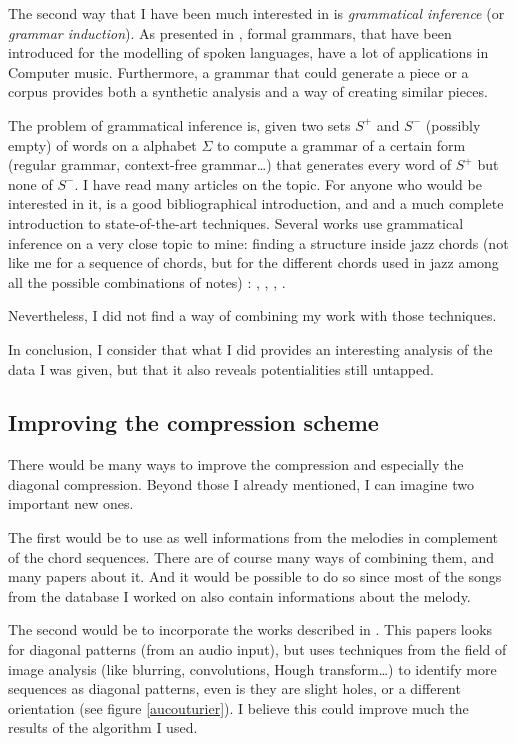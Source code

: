 \documentclass[a4paper,10pt]{article}
\begin{document}
The second way that I have been much interested in is \emph{grammatical inference} (or \emph{grammar induction}). As presented in \cite{goldabdallah}, formal grammars, that have been introduced for the modelling of spoken languages, have a lot of applications in Computer music. Furthermore, a grammar that could generate a piece or a corpus provides both a synthetic analysis and a way of creating similar pieces.

The problem of grammatical inference is, given two sets $S^+$ and $S^-$ (possibly empty) of words on a alphabet $\Sigma$ to compute a grammar of a certain form (regular grammar, context-free grammar\dots) that generates every word of $S^+$ but none of $S^-$. I have read many articles on the topic. For anyone who would be interested in it, \cite{bibliogrammar} is a good bibliographical introduction, and \cite{survey1} and \cite{survey2} a much complete introduction to state-of-the-art techniques. Several works use grammatical inference on a very close topic to mine: finding a structure inside jazz chords (not like me for a sequence of chords, but for the different chords used in jazz among all the possible combinations of notes) : \cite{jazzgrammar1}, \cite{jazzgrammar2}, \cite{jazzgrammar3}, \cite{jazzgrammar4}.

Nevertheless, I did not find a way of combining my work with those techniques.

In conclusion, I consider that what I did provides an interesting analysis of the data I was given, but that it also reveals potentialities still untapped.


\subsection{Improving the compression scheme}

There would be many ways to improve the compression and especially the diagonal compression. Beyond those I already mentioned, I can imagine two important new ones.

The first would be to use as well informations from the melodies in complement of the chord sequences. There are of course many ways of combining them, and many papers about it. And it would be possible to do so since most of the songs from the database I worked on also contain informations about the melody.

The second would be to incorporate the works described in \cite{aucouturier2002finding}. This papers looks for diagonal patterns (from an audio input), but uses techniques from the field of image analysis (like blurring, convolutions, Hough transform\dots) to identify more sequences as diagonal patterns, even is they are slight holes, or a different orientation (see figure \ref{aucouturier}). I believe this could improve much the results of the algorithm I used.
\end{document}
